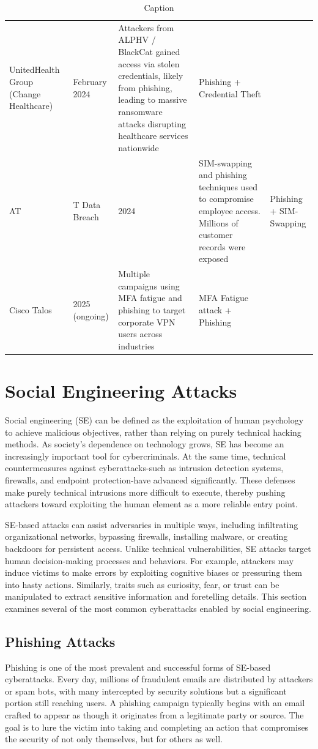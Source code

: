 {\begin{table}
\begin{tabular}{lllll}
       UnitedHealth Group (Change Healthcare)& February 2024& Attackers from ALPHV / BlackCat gained access via stolen credentials, likely from phishing, leading to massive ransomware attacks disrupting healthcare services nationwide& Phishing + Credential Theft\\
       AT&T Data Breach& 2024& SIM-swapping and phishing techniques used to compromise employee access. Millions of customer records were exposed& Phishing + SIM-Swapping\\
       Cisco Talos& 2025 (ongoing)& Multiple campaigns using MFA fatigue and phishing to target corporate VPN users across industries& MFA Fatigue attack + Phishing
    \end{tabular}
    \caption{Caption}
    \label{tab:placeholder}
\end{table}

\section{Social Engineering Attacks}
Social engineering (SE) can be defined as the exploitation of human psychology to achieve malicious objectives, rather than relying on purely technical hacking methods. As society's dependence on technology grows, SE has become an increasingly important tool for cybercriminals. At the same time, technical countermeasures against cyberattacks-such as intrusion detection systems, firewalls, and endpoint protection-have advanced significantly. These defenses make purely technical intrusions more difficult to execute, thereby pushing attackers toward exploiting the human element as a more reliable entry point.

SE-based attacks can assist adversaries in multiple ways, including infiltrating organizational networks, bypassing firewalls, installing malware, or creating backdoors for persistent access. Unlike technical vulnerabilities, SE attacks target human decision-making processes and behaviors. For example, attackers may induce victims to make errors by exploiting cognitive biases or pressuring them into hasty actions. Similarly, traits such as curiosity, fear, or trust can be manipulated to extract sensitive information and foretelling details. This section examines several of the most common cyberattacks enabled by social engineering.

\subsection{Phishing Attacks}
Phishing is one of the most prevalent and successful forms of SE-based cyberattacks. Every day, millions of fraudulent emails are distributed by attackers or spam bots, with many intercepted by security solutions but a significant portion still reaching users. A phishing campaign typically begins with an email crafted to appear as though it originates from a legitimate party or source. The goal is to lure the victim into taking and completing an action that compromises the security of not only themselves, but for others as well.

}
